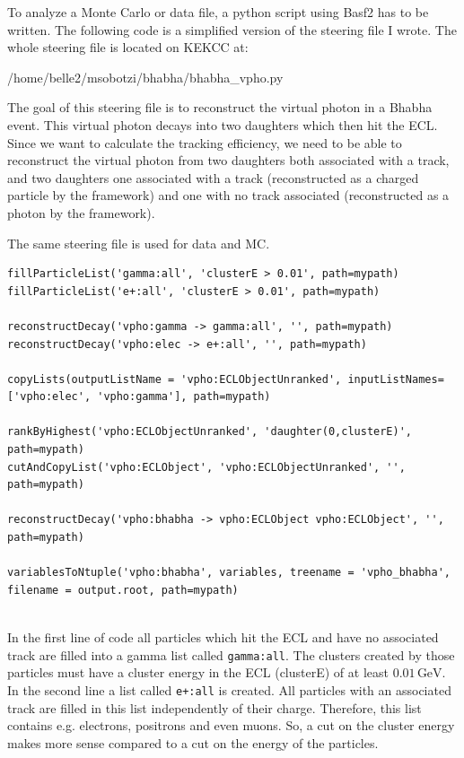 \documentclass[a4paper,11pt,twosided,final,german,openbib,pdftex,listof=totoc,bibliography=totoc]{scrbook}
\begin{document}
To analyze a Monte Carlo or data file, a python script using Basf2 has to be written. The following code is a simplified version of the steering file I wrote. 
The whole steering file is located on KEKCC at:


/home/belle2/msobotzi/bhabha/bhabha\_vpho.py
\newline


The goal of this steering file is to reconstruct the virtual photon in a Bhabha event. This virtual photon decays into two daughters which then hit the ECL. Since we want to calculate the tracking efficiency, we need to be able to reconstruct the virtual photon from two daughters both associated with a track, and two daughters one associated with a track (reconstructed as a charged particle by the framework) and one with no track associated (reconstructed as a photon by the framework).

The same steering file is used for data and MC.
\newline 


{
\begin{lstlisting}
fillParticleList('gamma:all', 'clusterE > 0.01', path=mypath)
fillParticleList('e+:all', 'clusterE > 0.01', path=mypath)

reconstructDecay('vpho:gamma -> gamma:all', '', path=mypath)
reconstructDecay('vpho:elec -> e+:all', '', path=mypath)

copyLists(outputListName = 'vpho:ECLObjectUnranked', inputListNames=['vpho:elec', 'vpho:gamma'], path=mypath)

rankByHighest('vpho:ECLObjectUnranked', 'daughter(0,clusterE)', path=mypath)
cutAndCopyList('vpho:ECLObject', 'vpho:ECLObjectUnranked', '', path=mypath)
	
reconstructDecay('vpho:bhabha -> vpho:ECLObject vpho:ECLObject', '', path=mypath)

variablesToNtuple('vpho:bhabha', variables, treename = 'vpho_bhabha', filename = output.root, path=mypath)
	
\end{lstlisting}
}
\bigskip


In the first line of code all particles which hit the ECL and have no associated track are filled into a gamma list called \texttt{gamma:all}. The clusters created by those particles must have a cluster energy in the ECL (clusterE) of at least $0.01\,\textrm{GeV}$. In the second line a list called \texttt{e+:all} is created. All particles with an associated track are filled in this list independently of their charge. Therefore, this list contains e.g. electrons, positrons and even muons. So, a cut on the cluster energy makes more sense compared to a cut on the energy of the particles.
\end{document}
